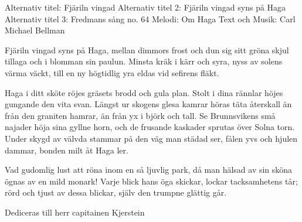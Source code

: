 \begin{song}


\begin{songmeta}
Alternativ titel: Fjäriln vingad
Alternativ titel 2: Fjäriln vingad syns på Haga
Alternativ titel 3: Fredmans sång no. 64
Melodi: Om Haga
Text och Musik: Carl Michael Bellman
\end{songmeta}

\begin{songtext}
Fjäriln vingad syns på Haga,
mellan dimmors frost och dun
sig sitt gröna skjul tillaga
och i blomman sin paulun.
Minsta kräk i kärr och syra,
nyss av solens värma väckt,
till en ny högtidlig yra
eldas vid sefirens fläkt.

Haga i ditt sköte röjes
gräsets brodd och gula plan.
Stolt i dina rännlar höjes
gungande den vita svan.
Längst ur skogens glesa kamrar
höras täta återskall
än från den graniten hamrar,
än från yx i björk och tall.
\newpage
Se Brunnsvikens små najader
höja sina gyllne horn,
och de frusande kaskader
sprutas över Solna torn.
Under skygd av välvda stammar
på den väg man städad ser,
fålen yvs och hjulen dammar,
bonden milt åt Haga ler.

Vad gudomlig lust att röna
inom en så ljuvlig park,
då man hälsad av sin sköna
ögnas av en mild monark!
Varje blick hans öga skickar,
lockar tacksamhetens tår;
rörd och tjust av dessa blickar,
själv den trumpne glättig går.
\end{songtext}

\begin{songnotes}
Dediceras till herr capitainen Kjerstein
\end{songnotes}

\end{song}
